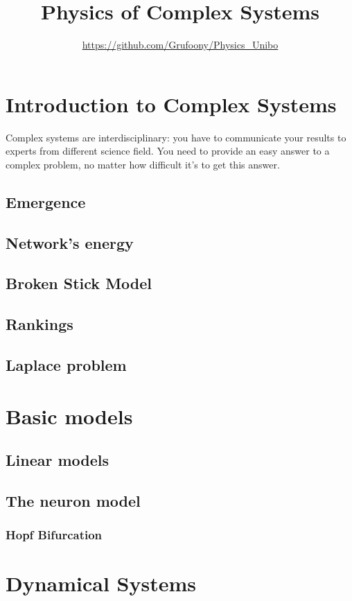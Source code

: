 \documentclass[12pt]{book}
\title{Physics of Complex Systems} \author{\url{https://github.com/Grufoony/Physics_Unibo}}
\date{}
\begin{document}
\maketitle
\tableofcontents
\pagebreak

\chapter{Introduction to Complex Systems}
Complex systems are interdisciplinary: you have to communicate your results to experts from different science field.
You need to provide an easy answer to a complex problem, no matter how difficult it's to get this answer.
\section{Emergence}

\section{Network's energy}

\section{Broken Stick Model}

\section{Rankings}

\section{Laplace problem}

\chapter{Basic models}
\section{Linear models}

\section{The neuron model}

\subsection{Hopf Bifurcation}

\chapter{Dynamical Systems}

\end{document}
